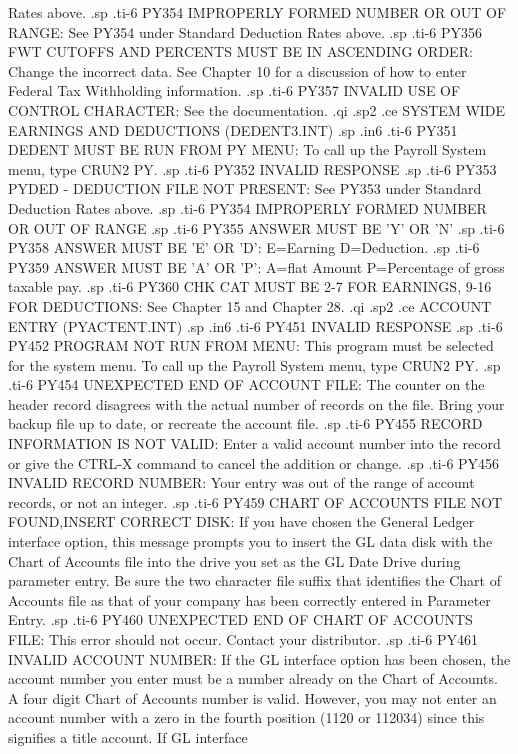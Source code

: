 Rates above.
.sp
.ti-6
PY354 IMPROPERLY FORMED NUMBER OR OUT OF RANGE: See PY354 under Standard
Deduction Rates above.
.sp
.ti-6
PY356 FWT CUTOFFS AND PERCENTS MUST BE IN ASCENDING ORDER:  Change
the incorrect data. See Chapter 10 for a discussion of how to enter
Federal Tax Withholding information.
.sp
.ti-6
PY357 INVALID USE OF CONTROL CHARACTER: See the documentation.
.qi
.sp2
.ce
SYSTEM WIDE EARNINGS AND DEDUCTIONS (DEDENT3.INT)
.sp
.in6
.ti-6
PY351 DEDENT MUST BE RUN FROM PY MENU: To call up the Payroll System
menu, type CRUN2 PY.
.sp
.ti-6
PY352 INVALID RESPONSE
.sp
.ti-6
PY353 PYDED - DEDUCTION FILE NOT PRESENT: See PY353 under Standard Deduction
Rates above.
.sp
.ti-6
PY354 IMPROPERLY FORMED NUMBER OR OUT OF RANGE
.sp
.ti-6
PY355 ANSWER MUST BE 'Y' OR 'N'
.sp
.ti-6
PY358 ANSWER MUST BE 'E' OR 'D': E=Earning D=Deduction.
.sp
.ti-6
PY359 ANSWER MUST BE 'A' OR 'P': A=flat Amount P=Percentage of gross
taxable pay.
.sp
.ti-6
PY360 CHK CAT MUST BE 2-7 FOR EARNINGS, 9-16 FOR DEDUCTIONS: See Chapter 15
and Chapter 28.
.qi
.sp2
.ce
ACCOUNT ENTRY (PYACTENT.INT)
.sp
.in6
.ti-6
PY451 INVALID RESPONSE
.sp
.ti-6
PY452 PROGRAM NOT RUN FROM MENU:  This program must be selected for the
system menu.  To call up the Payroll System menu, type CRUN2 PY.
.sp
.ti-6
PY454 UNEXPECTED END OF ACCOUNT FILE: The counter on the header record
disagrees with the actual number of records on the file.  Bring your
backup file up to date, or recreate the account file.
.sp
.ti-6
PY455 RECORD INFORMATION IS NOT VALID: Enter a valid account number
into the record or give the CTRL-X command to cancel the addition or
change.
.sp
.ti-6
PY456 INVALID RECORD NUMBER: Your entry was out of the range of account
records, or not an integer.
.sp
.ti-6
PY459 CHART OF ACCOUNTS FILE NOT FOUND,INSERT CORRECT DISK: If you have
chosen the General Ledger interface option, this message prompts you to
insert the GL data disk with the Chart of Accounts file into the drive
you set as the GL Date Drive during parameter entry.  Be sure the
two character file suffix that identifies the Chart of Accounts file as
that of your company has been correctly entered in Parameter Entry.
.sp
.ti-6
PY460 UNEXPECTED END OF CHART OF ACCOUNTS FILE: This error should not
occur.	Contact your distributor.
.sp
.ti-6
PY461 INVALID ACCOUNT NUMBER: If the GL interface option has been chosen,
the account number you enter must be a number already on the Chart of
Accounts.  A four digit Chart of Accounts number is valid.  However,
you may not enter an account number with a zero in the fourth position
(1120 or 112034) since this signifies a title account.	If GL interface

